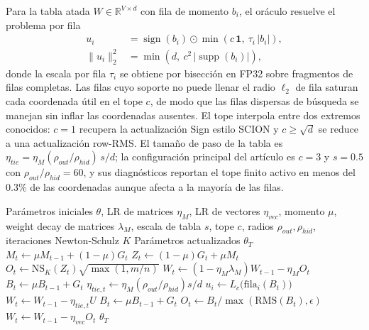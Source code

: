 Para la tabla atada $W \in \mathbb{R}^{V \times d}$ con fila de momento $b_i$, el oráculo resuelve el problema por fila
\begin{align}
u_i &= \operatorname{sign}(b_i) \odot \min\left(c\,\mathbf{1},\ \tau_i\,|b_i|\right), \\
\|u_i\|_2^2 &= \min\left(d,\ c^2\,\bigl|\operatorname{supp}(b_i)\bigr|\right),
\end{align}
donde la escala por fila $\tau_i$ se obtiene por bisección en FP32 sobre fragmentos de filas completas. Las filas cuyo soporte no puede llenar el radio $\ell_2$ de fila saturan cada coordenada útil en el tope $c$, de modo que las filas dispersas de búsqueda se manejan sin inflar las coordenadas ausentes. El tope interpola entre dos extremos conocidos: $c = 1$ recupera la actualización Sign estilo SCION y $c \geq \sqrt{d}$ se reduce a una actualización row-RMS. El tamaño de paso de la tabla es $\eta_{tie} = \eta_M (\rho_{out}/\rho_{hid})\, s / d$; la configuración principal del artículo es $c = 3$ y $s = 0.5$ con $\rho_{out}/\rho_{hid} = 60$, y sus diagnósticos reportan el tope finito activo en menos del 0.3\% de las coordenadas aunque afecta a la mayoría de las filas.

\begin{algorithm}[H]
\caption{AF-Muon (Muon sin AdamW para Vocabulario Atado)}
\label{alg:af-muon}
\begin{algorithmic}[1]
\Require Parámetros iniciales $\theta$, LR de matrices $\eta_M$, LR de vectores $\eta_{vec}$, momento $\mu$, weight decay de matrices $\lambda_M$, escala de tabla $s$, tope $c$, radios $\rho_{out}, \rho_{hid}$, iteraciones Newton-Schulz $K$
\Ensure Parámetros actualizados $\theta_T$
        \State $M_t \gets \mu M_{t-1} + (1-\mu) G_t$ 
        \State $Z_t \gets (1-\mu) G_t + \mu M_t$ 
        \State $O_t \gets \mathrm{NS}_K(Z_t)\sqrt{\max(1, m/n)}$ 
        \State $W_t \gets (1 - \eta_M \lambda_M) W_{t-1} - \eta_M O_t$
        \State $B_t \gets \mu B_{t-1} + G_t$ 
        \State $\eta_{tie,t} \gets \eta_M (\rho_{out}/\rho_{hid}) s / d$
            \State $u_i \gets L_c\bigl(\mathrm{fila}_i(B_t)\bigr)$ 
        \EndFor
        \State $W_t \gets W_{t-1} - \eta_{tie,t} U$
    \Else
        \State $B_t \gets \mu B_{t-1} + G_t$ 
        \State $O_t \gets B_t / \max(\mathrm{RMS}(B_t), \epsilon)$
        \State $W_t \gets W_{t-1} - \eta_{vec} O_t$
    \EndIf
\EndFor
\Return $\theta_T$
\end{algorithmic}
\end{algorithm}

